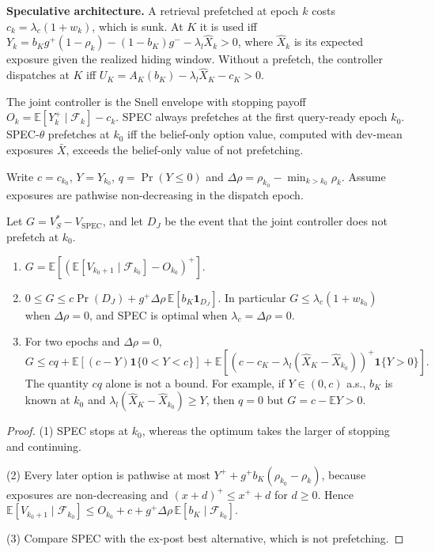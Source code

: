 \textbf{Speculative architecture.} A retrieval prefetched at epoch $k$ costs
$c_k=\lambda_c(1+w_k)$, which is sunk. At $K$ it is used iff
$Y_k=b_Kg^{+}(1-\rho_k)-(1-b_K)g^{-}-\lambda_l\hat X_k>0$, where $\hat X_k$ is
its expected exposure given the realized hiding window. Without a prefetch,
the controller dispatches at $K$ iff
$U_K=A_K(b_K)-\lambda_l\hat X_K-c_K>0$.

The joint controller is the Snell envelope with stopping payoff
$O_k=\mathbb E[Y_k^{+}\mid\mathcal F_k]-c_k$. SPEC always prefetches at the
first query-ready epoch $k_0$. SPEC-$\theta$ prefetches at $k_0$ iff the
belief-only option value, computed with dev-mean exposures $\bar X$, exceeds
the belief-only value of not prefetching.

Write $c=c_{k_0}$, $Y=Y_{k_0}$, $q=\Pr(Y\le0)$ and
$\Delta\rho=\rho_{k_0}-\min_{k>k_0}\rho_k$. Assume exposures are pathwise
non-decreasing in the dispatch epoch.

\begin{proposition}\label{prop:spec}
Let $G=V^{*}_S-V_{\mathrm{SPEC}}$, and let $D_J$ be the event that the joint
controller does not prefetch at $k_0$.
\begin{enumerate}
\item $G=\mathbb E[(\mathbb E[V_{k_0+1}\mid\mathcal F_{k_0}]-O_{k_0})^{+}]$.
\item $0\le G\le c\Pr(D_J)+g^{+}\Delta\rho\,\mathbb E[b_K\mathbf 1_{D_J}]$.
In particular $G\le\lambda_c(1+w_{k_0})$ when $\Delta\rho=0$, and SPEC is
optimal when $\lambda_c=\Delta\rho=0$.
\item For two epochs and $\Delta\rho=0$,
\[
G\le cq+\mathbb E[(c-Y)\mathbf 1\{0<Y<c\}]
+\mathbb E[(c-c_K-\lambda_l(\hat X_K-\hat X_{k_0}))^{+}\mathbf 1\{Y>0\}].
\]
The quantity $cq$ alone is not a bound. For example, if $Y\in(0,c)$ a.s.,
$b_K$ is known at $k_0$ and $\lambda_l(\hat X_K-\hat X_{k_0})\ge Y$, then
$q=0$ but $G=c-\mathbb EY>0$.
\end{enumerate}
\end{proposition}
\begin{proof}
(1) SPEC stops at $k_0$, whereas the optimum takes the larger of stopping and
continuing.

(2) Every later option is pathwise at most
$Y^{+}+g^{+}b_K(\rho_{k_0}-\rho_k)$, because exposures are non-decreasing and
$(x+d)^{+}\le x^{+}+d$ for $d\ge0$. Hence
$\mathbb E[V_{k_0+1}\mid\mathcal F_{k_0}]\le O_{k_0}+c+g^{+}\Delta\rho\,\mathbb E[b_K\mid\mathcal F_{k_0}]$.

(3) Compare SPEC with the ex-post best alternative, which is not prefetching.
\end{proof}

